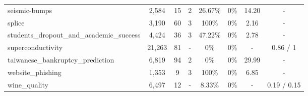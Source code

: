 \begin{table}[ht]
{\begin{tabular}{lccccccc}
seismic-bumps & 2,584 & 15 & 2 & 26.67\% & 0\% & 14.20 & - \\
splice & 3,190 & 60 & 3 & 100\% & 0\% & 2.16 & - \\
students\_dropout\_and\_academic\_success & 4,424 & 36 & 3 & 47.22\% & 0\% & 2.78 & - \\
superconductivity & 21,263 & 81 & - & 0\% & 0\% & - & 0.86 / 1 \\
taiwanese\_bankruptcy\_prediction & 6,819 & 94 & 2 & 0\% & 0\% & 29.99 & - \\
website\_phishing & 1,353 & 9 & 3 & 100\% & 0\% & 6.85 & - \\
wine\_quality & 6,497 & 12 & - & 8.33\% & 0\% & - & 0.19 / 0.15 \\
\bottomrule
\end{tabular}
}
\end{table}